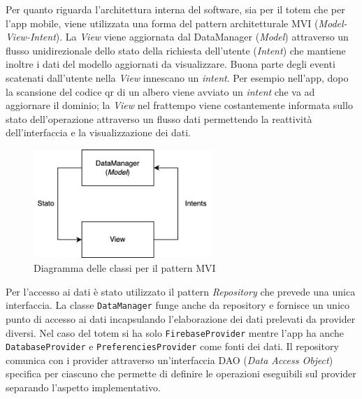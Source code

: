 
Per quanto riguarda l'architettura interna del software, sia per il totem che per l'app mobile, viene utilizzata una forma del pattern architetturale MVI (\textit{Model-View-Intent}). La \textit{View} viene aggiornata dal DataManager (\textit{Model}) attraverso un flusso unidirezionale dello stato della richiesta dell'utente (\textit{Intent}) che mantiene inoltre i dati del modello aggiornati da visualizzare.
Buona parte degli eventi scatenati dall'utente nella \textit{View} innescano un \textit{intent}.
Per esempio nell'app, dopo la scansione del codice qr di un albero viene avviato un \textit{intent} che va ad aggiornare il dominio; la \textit{View} nel frattempo viene costantemente informata sullo stato dell'operazione attraverso un flusso dati permettendo la reattività dell'interfaccia e la visualizzazione dei dati.
\begin{figure}
    \centering
    \includegraphics[width=0.6\textwidth]{img/totem/mvi-schema.png}
    \caption{Diagramma delle classi per il pattern MVI}
    \label{fig:mviPattern}
\end{figure}

Per l'accesso ai dati è stato utilizzato il pattern \textit{Repository} che prevede una unica interfaccia. La classe \texttt{DataManager} funge anche da repository e fornisce un unico punto di accesso ai dati incapsulando l'elaborazione dei dati prelevati da provider diversi.
Nel caso del totem si ha solo \texttt{FirebaseProvider} mentre l'app ha anche \texttt{DatabaseProvider} e \texttt{PreferenciesProvider} come fonti dei dati.
Il repository comunica con i provider attraverso un'interfaccia DAO (\textit{Data Access Object}) specifica per ciascuno che permette di definire le operazioni eseguibili sul provider separando l'aspetto implementativo.

